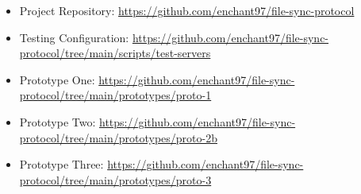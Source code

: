 \begin{itemize}
    \label{project-links}
    \item Project Repository: \url{https://github.com/enchant97/file-sync-protocol}
    \item Testing Configuration: \url{https://github.com/enchant97/file-sync-protocol/tree/main/scripts/test-servers}
    \item Prototype One: \url{https://github.com/enchant97/file-sync-protocol/tree/main/prototypes/proto-1}
    \item Prototype Two: \url{https://github.com/enchant97/file-sync-protocol/tree/main/prototypes/proto-2b}
    \item Prototype Three: \url{https://github.com/enchant97/file-sync-protocol/tree/main/prototypes/proto-3}
\end{itemize}
